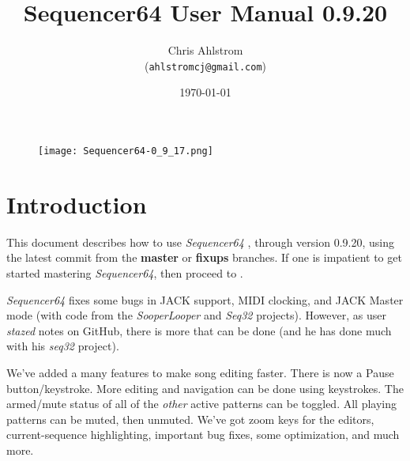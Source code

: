 \documentclass[
 11pt,
 twoside,
 a4paper,
 headinclude,
 footinclude,
 final                                 %
]{article}
\begin{document}
\title{Sequencer64 User Manual 0.9.20}
\author{Chris Ahlstrom \\
   (\texttt{ahlstromcj@gmail.com})}
\date{\today}
\maketitle

\begin{figure}[H]
   \centering 
   \texttt{[image: Sequencer64-0\_9\_17.png]}
\end{figure}

\clearpage                             %

\tableofcontents
\listoffigures                         %
\listoftables                          %


\setlength{\parindent}{0pt}
\setlength{\parskip}{1ex plus 0.5ex minus 0.2ex}

\section{Introduction}
\label{sec:introduction}

   This document describes how to use \textsl{Sequencer64}
   \cite{sequencer64}, through version 0.9.20,
   using the latest commit from the
   \textbf{master} or \textbf{fixups} branches.
   If one is impatient to get started mastering \textsl{Sequencer64},
   then proceed to .

   \textsl{Sequencer64} fixes some bugs in JACK support, MIDI clocking, and
   JACK Master mode (with code from the \textsl{SooperLooper} 
   and \textsl{Seq32} projects).
   However, as user \textsl{stazed} notes on GitHub, there is more that can be
   done (and he has done much with his \textsl{seq32} \cite{seq32} project).

   We've added a many features to make song editing faster.
   There is now a Pause button/keystroke.
   More editing and navigation can be done using keystrokes.
   The armed/mute status of all of the \textsl{other} active patterns can be
   toggled.  All playing patterns can be muted, then unmuted.
   We've got zoom keys for the editors, current-sequence highlighting,
   important bug fixes, some optimization, and much more.
\end{document}

